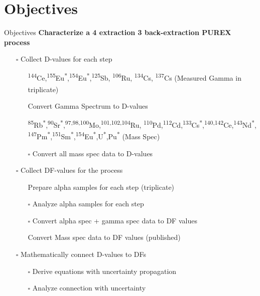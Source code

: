 \documentclass{beamer}
\newcommand{\tss}{\textsuperscript}
\newcommand{\cmark}{\ding{51}}%
\newcommand{\done}{\rlap{$\square$}{\raisebox{2pt}{\large\hspace{1pt}\cmark}}%
  \hspace{-2.5pt}}
\newcommand{\notdone}{$\square$}
\begin{document}
\section{Objectives}
\begin{frame}[allowframebreaks]{Objectives}
\vspace{-0.7cm}
\textbf{\small Characterize a 4 extraction 3 back-extraction PUREX process}
\begin{itemize}
\item[\notdone]{Collect D-values for each step}
  \begin{itemize}
  \item[\tiny\done]{\tiny \tss{144}Ce,\tss{155}Eu\tss{*},\tss{154}Eu\tss{*},\tss{125}Sb,
    \tss{106}Ru, \tss{134}Cs, \tss{137}Cs
    (Measured Gamma in triplicate)\tss{\cite{chirayath2015trace}}}
  \item[\tiny\done]{\tiny Convert Gamma Spectrum to D-values}
  \item[\tiny\done]{\tiny \tss{85}Rb\tss{*},\tss{90}Sr\tss{*},\tss{97,98,100}Mo,\tss{101,102,104}Ru,
    \tss{110}Pd,\tss{112}Cd,\tss{133}Cs\tss{*},\tss{140,142}Ce,\tss{143}Nd\tss{*},
    \tss{147}Pm\tss{*},\tss{151}Sm\tss{*},\tss{154}Eu\tss{*},U\tss{*},Pu\tss{*} (Mass Spec)}
  \item[\tiny\notdone]{\tiny Convert all mass spec data to D-values}
  \end{itemize}
\item[\notdone]{Collect DF-values for the process}
  \begin{itemize}
  \item[\tiny\done]{\tiny Prepare alpha samples for each step (triplicate)}
  \item[\tiny\notdone]{\tiny Analyze alpha samples for each step}
  \item[\tiny\notdone]{\tiny Convert alpha spec + gamma spec data to DF values}
  \item[\tiny\done]{\tiny Convert Mass spec data to DF values (published)}
  \end{itemize}
\item[\notdone]{Mathematically connect D-values to DFs}
  \begin{itemize}
  \item[\tiny\notdone]{\tiny Derive equations with uncertainty propagation}
  \item[\tiny\notdone]{\tiny Analyze connection with uncertainty}
  \end{itemize}
\end{itemize}
\framebreak
\vspace*{-1cm}

\end{frame}
\end{document}
